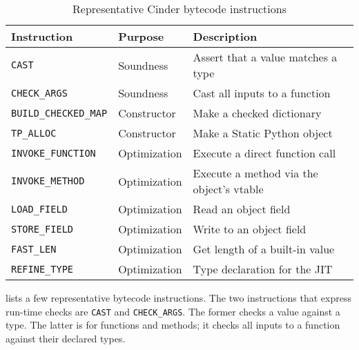 \documentclass[english,cleveref,submission]{programming}
\newcommand{\SP}{Static Python}
\newcommand{\code}[1]{\texttt{#1}}
\newcommand{\bcinst}[1]{\code{#1}}
\begin{document}
\begin{table}
  \caption{Representative Cinder bytecode instructions}
  \label{t:bytecode}

  \begin{tabular}{lll}
    {Instruction} & {Purpose} & {Description} \\\hline
    \bcinst{CAST} & Soundness & Assert that a value matches a type \\
    \bcinst{CHECK\_ARGS} & Soundness & Cast all inputs to a function \\[1ex]

    \bcinst{BUILD\_CHECKED\_MAP} & Constructor & Make a checked dictionary \\
    \bcinst{TP\_ALLOC} & Constructor & Make a \SP{} object \\[1ex]

    \bcinst{INVOKE\_FUNCTION} & Optimization & Execute a direct function call \\
    \bcinst{INVOKE\_METHOD} & Optimization & Execute a method via the object's vtable \\
    \bcinst{LOAD\_FIELD} & Optimization & Read an object field \\
    \bcinst{STORE\_FIELD} & Optimization & Write to an object field \\
    \bcinst{FAST\_LEN} & Optimization & Get length of a built-in value \\
    \bcinst{REFINE\_TYPE} & Optimization & Type declaration for the JIT \\


  \end{tabular}
\end{table}

 lists a few representative bytecode instructions.
The two instructions that express run-time checks are \code{CAST}
and \code{CHECK\_ARGS}.
The former checks a value against a type.
The latter is for functions and methods; it checks all inputs to a function
against their declared types.
\end{document}
